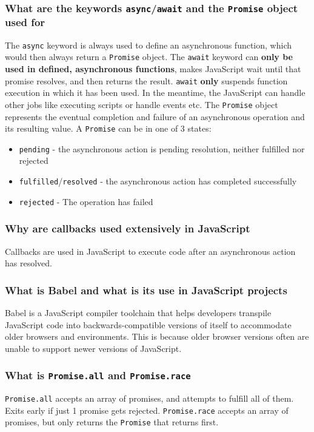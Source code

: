\documentclass[12pt, a4paper]{article}
\newcommand{\code}[1]{\texttt{#1}}
\begin{document}
\subsubsection*{What are the keywords \code{async}/\code{await} and the \code{Promise} object used for}
The \code{async} keyword is always used to define an asynchronous function, which would then always return a \code{Promise} object.\newline
The \code{await} keyword can \textbf{only be used in defined, asynchronous functions}, makes JavaScript wait until that promise resolves, and then returns the result.
\code{await} \textbf{only} suspends function execution in which it has been used.
In the meantime, the JavaScript can handle other jobs like executing scripts or handle events etc.\newline
The \code{Promise} object represents the eventual completion and failure of an asynchronous operation and its resulting value.
A \code{Promise} can be in one of 3 states:
\begin{itemize}
    \item \code{pending} - the asynchronous action is pending resolution, neither fulfilled nor rejected
    \item \code{fulfilled}/\code{resolved} - the asynchronous action has completed successfully
    \item \code{rejected} - The operation has failed
\end{itemize}

\subsubsection*{Why are callbacks used extensively in JavaScript}
Callbacks are used in JavaScript to execute code after an asynchronous action has resolved.

\subsubsection*{What is Babel and what is its use in JavaScript projects}
Babel is a JavaScript compiler toolchain that helps developers transpile JavaScript code into backwards-compatible versions of itself to accommodate older browsers and environments.
This is because older browser versions often are unable to support newer versions of JavaScript.

\subsubsection*{What is \code{Promise.all} and \code{Promise.race}}
\code{Promise.all} accepts an array of promises, and attempts to fulfill all of them.
Exits early if just 1 promise gets rejected.\newline
\code{Promise.race} accepts an array of promises, but only returns the \code{Promise} that returns first.
\end{document}
